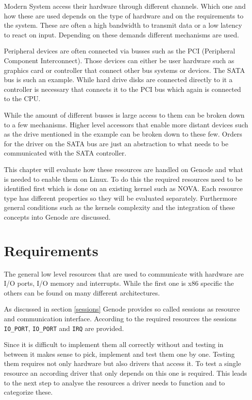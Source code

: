\documentclass[
a4paper,
12pt,
notitlepage,
parskip=half,
DIV=11,
]{scrbook}
\begin{document}
		Modern System access their hardware through different channels.
		Which one and how these are used depends on the type of hardware and on the requirements to the system.
		These are often a high bandwidth to transmit data or a low latency to react on input.
		Depending on these demands different mechanisms are used.
		
		Peripheral devices are often connected via busses such as the PCI (Peripheral Component Interconnect).
		Those devices can either be user hardware such as graphics card or controller that connect other bus systems or devices.
		The SATA bus is such an example.
		While hard drive disks are connected directly to it a controller is necessary that connects it to the PCI bus which again is connected to the CPU.
		
		While the amount of different busses is large access to them can be broken down to a few mechanisms.
		Higher level accessors that enable more distant devices such as the drive mentioned in the example can be broken down to these few.
		Orders for the driver on the SATA bus are just an abstraction to what needs to be communicated with the SATA controller. \citep{iosystems}
		
		This chapter will evaluate how these resources are handled on Genode and what is needed to enable them on Linux.
		To do this the required resources need to be identified first which is done on an existing kernel such as NOVA.
		Each resource type has different properties so they will be evaluated separately.
		Furthermore general conditions such as the kernels complexity and the integration of these concepts into Genode are discussed.
		
		\section{Requirements}
		
		The general low level resources that are used to communicate with hardware are I/O ports, I/O memory and interrupts.
		While the first one is x86 specific the others can be found on many different architectures.
		
		As discussed in section \ref{sessions} Genode provides so called sessions as resource and communication interface.
		According to the required resources the sessions \texttt{IO\_PORT}, \texttt{IO\_PORT} and \texttt{IRQ} are provided.
		
		Since it is difficult to implement them all correctly without and testing in between it makes sense to pick, implement and test them one by one.
		Testing them requires not only hardware but also drivers that access it.
		To test a single resource an according driver that only depends on this one is required.
		This leads to the next step to analyse the resources a driver needs to function and to categorize these.
		
\end{document}
